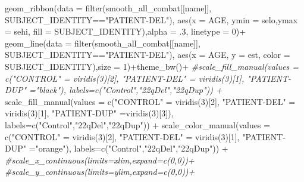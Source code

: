 \documentclass[
]{article}
\newenvironment{Shaded}{\begin{snugshade}}{\end{snugshade}}
\newcommand{\AttributeTok}[1]{\textcolor[rgb]{0.77,0.63,0.00}{#1}}
\newcommand{\CommentTok}[1]{\textcolor[rgb]{0.56,0.35,0.01}{\textit{#1}}}
\newcommand{\DecValTok}[1]{\textcolor[rgb]{0.00,0.00,0.81}{#1}}
\newcommand{\FunctionTok}[1]{\textcolor[rgb]{0.00,0.00,0.00}{#1}}
\newcommand{\NormalTok}[1]{#1}
\newcommand{\OtherTok}[1]{\textcolor[rgb]{0.56,0.35,0.01}{#1}}
\newcommand{\SpecialCharTok}[1]{\textcolor[rgb]{0.00,0.00,0.00}{#1}}
\newcommand{\StringTok}[1]{\textcolor[rgb]{0.31,0.60,0.02}{#1}}
\begin{document}
\begin{Shaded}
\begin{Highlighting}[]
    \FunctionTok{geom\_ribbon}\NormalTok{(}\AttributeTok{data =} \FunctionTok{filter}\NormalTok{(smooth\_all\_combat[[name]], SUBJECT\_IDENTITY}\SpecialCharTok{==}\StringTok{"PATIENT{-}DEL"}\NormalTok{),}
                \FunctionTok{aes}\NormalTok{(}\AttributeTok{x =}\NormalTok{ AGE, }\AttributeTok{ymin =}\NormalTok{ selo,}\AttributeTok{ymax =}\NormalTok{ sehi, }\AttributeTok{fill =}\NormalTok{ SUBJECT\_IDENTITY),}\AttributeTok{alpha =}\NormalTok{ .}\DecValTok{3}\NormalTok{, }\AttributeTok{linetype =} \DecValTok{0}\NormalTok{)}\SpecialCharTok{+}
    \FunctionTok{geom\_line}\NormalTok{(}\AttributeTok{data =} \FunctionTok{filter}\NormalTok{(smooth\_all\_combat[[name]], SUBJECT\_IDENTITY}\SpecialCharTok{==}\StringTok{"PATIENT{-}DEL"}\NormalTok{),}
              \FunctionTok{aes}\NormalTok{(}\AttributeTok{x =}\NormalTok{ AGE, }\AttributeTok{y =}\NormalTok{ est, }\AttributeTok{color =}\NormalTok{ SUBJECT\_IDENTITY),}\AttributeTok{size =} \DecValTok{1}\NormalTok{)}\SpecialCharTok{+}\FunctionTok{theme\_bw}\NormalTok{()}\SpecialCharTok{+}
    \CommentTok{\#scale\_fill\_manual(values = c("CONTROL" = viridis(3)[2], "PATIENT{-}DEL" = viridis(3)[1], "PATIENT{-}DUP" ="black"), labels=c("Control","22qDel","22qDup")) +}
    \FunctionTok{scale\_fill\_manual}\NormalTok{(}\AttributeTok{values =} \FunctionTok{c}\NormalTok{(}\StringTok{"CONTROL"} \OtherTok{=} \FunctionTok{viridis}\NormalTok{(}\DecValTok{3}\NormalTok{)[}\DecValTok{2}\NormalTok{], }\StringTok{"PATIENT{-}DEL"} \OtherTok{=} \FunctionTok{viridis}\NormalTok{(}\DecValTok{3}\NormalTok{)[}\DecValTok{1}\NormalTok{], }\StringTok{"PATIENT{-}DUP"} \OtherTok{=}\FunctionTok{viridis}\NormalTok{(}\DecValTok{3}\NormalTok{)[}\DecValTok{3}\NormalTok{]), }\AttributeTok{labels=}\FunctionTok{c}\NormalTok{(}\StringTok{"Control"}\NormalTok{,}\StringTok{"22qDel"}\NormalTok{,}\StringTok{"22qDup"}\NormalTok{)) }\SpecialCharTok{+}
    \FunctionTok{scale\_color\_manual}\NormalTok{(}\AttributeTok{values =} \FunctionTok{c}\NormalTok{(}\StringTok{"CONTROL"} \OtherTok{=} \FunctionTok{viridis}\NormalTok{(}\DecValTok{3}\NormalTok{)[}\DecValTok{2}\NormalTok{], }\StringTok{"PATIENT{-}DEL"} \OtherTok{=} \FunctionTok{viridis}\NormalTok{(}\DecValTok{3}\NormalTok{)[}\DecValTok{1}\NormalTok{], }\StringTok{"PATIENT{-}DUP"} \OtherTok{=}\StringTok{"orange"}\NormalTok{), }\AttributeTok{labels=}\FunctionTok{c}\NormalTok{(}\StringTok{"Control"}\NormalTok{,}\StringTok{"22qDel"}\NormalTok{,}\StringTok{"22qDup"}\NormalTok{)) }\SpecialCharTok{+}
    \CommentTok{\#scale\_x\_continuous(limits=xlim,expand=c(0,0))+}
    \CommentTok{\#scale\_y\_continuous(limits=ylim,expand=c(0,0))+}

\end{Highlighting}
\end{Shaded}
\end{document}
